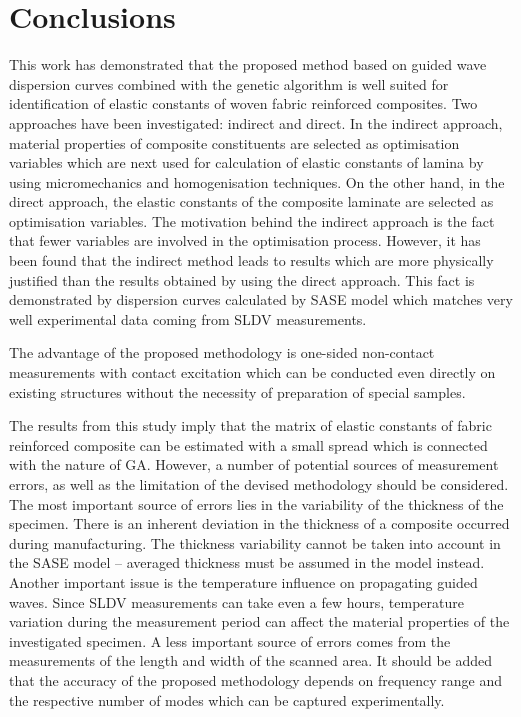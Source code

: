 \documentclass[preprint,12pt]{elsarticle}
\begin{document}
	\section{Conclusions}

	This work has demonstrated that the proposed method based on guided wave dispersion curves combined with the genetic algorithm is well suited for identification of elastic constants of woven fabric reinforced composites. Two approaches have been investigated: indirect and direct.  In the indirect approach, material properties of composite constituents are selected as optimisation variables which are next used for calculation of elastic constants of lamina by using micromechanics and homogenisation techniques. On the other hand, in the direct approach, the elastic constants of the composite laminate are selected as optimisation variables. The motivation behind the indirect approach is the fact that fewer variables are involved in the optimisation process. However, it has been found that the indirect method leads to results which are more physically justified than the results obtained by using the direct approach. This fact is demonstrated by dispersion curves calculated by SASE model which matches very well experimental data coming from SLDV measurements. 
	
	The advantage of the proposed methodology is one-sided non-contact measurements with contact excitation which can be conducted even directly on existing structures without the necessity of preparation of special samples.
	
	The results from this study imply that the matrix of elastic constants of fabric reinforced composite can be estimated with a small spread which is connected with the nature of GA. However, a number of potential sources of measurement errors, as well as the limitation of the devised methodology should be considered. The most important source of errors lies in the variability of the thickness of the specimen. There is an inherent deviation in the thickness of a composite occurred during manufacturing. The thickness variability cannot be taken into account in the SASE model -- averaged thickness must be assumed in the model instead. Another important issue is the temperature influence on propagating guided waves. Since SLDV measurements can take even a few hours, temperature variation during the measurement period can affect the material properties of the investigated specimen. A less important source of errors comes from the measurements of the length and width of the scanned area. It should be added that the accuracy of the proposed methodology depends on frequency range and the respective number of modes which can be captured experimentally.
	
\end{document}
